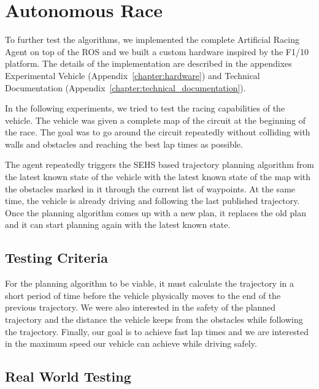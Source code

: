 \section{Autonomous Race}

To further test the algorithms, we implemented the complete Artificial Racing Agent on top of the \gls{ROS} and we built a custom hardware inspired by the F1/10 platform. The details of the implementation are described in the appendixes Experimental Vehicle (Appendix~\ref{chapter:hardware}) and Technical Documentation (Appendix~\ref{chapter:technical_documentation}).

In the following experiments, we tried to test the racing capabilities of the vehicle. The vehicle was given a complete map of the circuit at the beginning of the race. The goal was to go around the circuit repeatedly without colliding with walls and obstacles and reaching the best lap times as possible.

The agent repeatedly triggers the \gls{SEHS} based trajectory planning algorithm from the latest known state of the vehicle with the latest known state of the map with the obstacles marked in it through the current list of waypoints. At the same time, the vehicle is already driving and following the last published trajectory. Once the planning algorithm comes up with a new plan, it replaces the old plan and it can start planning again with the latest known state.

\subsection{Testing Criteria}
For the planning algorithm to be viable, it must calculate the trajectory in a short period of time before the vehicle physically moves to the end of the previous trajectory. We were also interested in the safety of the planned trajectory and the distance the vehicle keeps from the obstacles while following the trajectory. Finally, our goal is to achieve fast lap times and we are interested in the maximum speed our vehicle can achieve while driving safely.

\subsection{Real World Testing}

